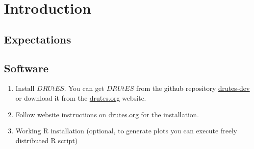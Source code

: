 \chapter{Introduction}

\section{Expectations}

\section{Software}

\begin{enumerate}
	\item Install $DRUtES$. You can get $DRUtES$ from the github repository \href{https://github.com/michalkuraz/drutes-dev/} {drutes-dev} or download it from the \href{http://drutes.org/public/?core=account}{drutes.org} website. 
	\item Follow website instructions on \href{http://drutes.org/public/?core=account}{drutes.org} for the installation.
	\item Working R installation (optional, to generate plots you can execute freely distributed R script) 
\end{enumerate}